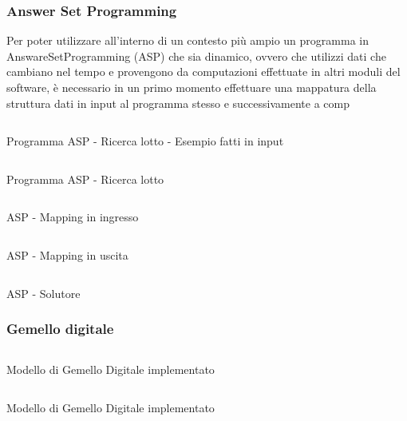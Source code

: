 \documentclass[a4paper,11pt]{article}
\newenvironment{longlisting}{\captionsetup{type=figure}}{}
\begin{document}
\subsubsection{Answer Set Programming}

Per poter utilizzare all'interno di un contesto più ampio un programma in AnswareSetProgramming (ASP) che sia dinamico, ovvero che utilizzi dati che cambiano nel tempo e provengono da computazioni effettuate in altri moduli del software, è necessario in un primo momento effettuare una mappatura della struttura dati in input al programma stesso e successivamente a comp

\begin{longlisting}
  \inputminted{prolog}{./code/checkBatchInput.lp}
  \caption{Programma ASP - Ricerca lotto - Esempio fatti in input}
  \label{listing:asp1}
\end{longlisting}


\begin{longlisting}
  \inputminted{prolog}{./code/checkBatch.lp}
  \caption{Programma ASP - Ricerca lotto}
  \label{listing:asp2}
\end{longlisting}

\begin{longlisting}
  \inputminted{java}{./code/asp.mapinput.java}
  \caption{ASP - Mapping in ingresso}
  \label{listing:asp3}
\end{longlisting}


\begin{longlisting}
  \inputminted{java}{./code/asp.mapout.java}
  \caption{ASP - Mapping in uscita}
  \label{listing:asp4}
\end{longlisting}

\begin{longlisting}
  \inputminted{java}{./code/asp.solve.java}
  \caption{ASP - Solutore}
  \label{listing:asp5}
\end{longlisting}

\subsubsection{Gemello digitale}

\begin{longlisting}
  \inputminted{json}{./code/Truck.json}
  \caption{Modello di Gemello Digitale implementato}
  \label{listing:dt0}
\end{longlisting}

\begin{longlisting}
  \inputminted{java}{./code/Truck.json}
  \caption{Modello di Gemello Digitale implementato}
  \label{listing:dt1}
\end{longlisting}
\end{document}
